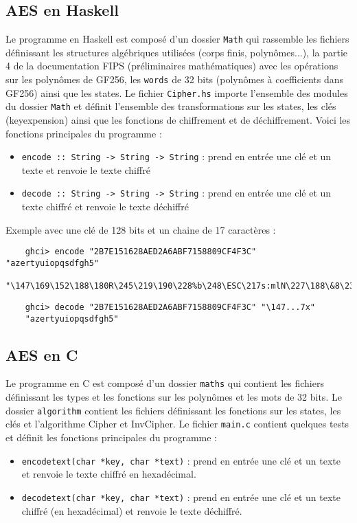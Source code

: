 \documentclass[12pt]{article}
\begin{document}
\subsection{AES en Haskell}
Le programme en Haskell est composé d'un dossier \texttt{Math} qui rassemble les fichiers définissant les structures algébriques utilisées (corps finis, polynômes...), la partie 4 de la documentation FIPS (préliminaires mathématiques) avec les opérations sur les polynômes de GF256, les \texttt{words} de 32 bits (polynômes à coefficients dans GF256) ainsi que les states. Le fichier \texttt{Cipher.hs} importe l'ensemble des modules du dossier \texttt{Math} et définit l'ensemble des transformations sur les states, les clés (keyexpension) ainsi que les fonctions de chiffrement et de déchiffrement. Voici les fonctions principales du programme :
\begin{itemize}
    \item \texttt{encode :: String -> String -> String} : prend en entrée une clé et un texte et renvoie le texte chiffré
    \item \texttt{decode :: String -> String -> String} : prend en entrée une clé et un texte chiffré et renvoie le texte déchiffré
\end{itemize}
Exemple avec une clé de 128 bits et un chaine de 17 caractères :
\begin{lstlisting}
    ghci> encode "2B7E151628AED2A6ABF7158809CF4F3C" "azertyuiopqsdfgh5"
    "\147\169\152\188\180R\245\219\190\228%b\248\ESC\217s:mlN\227\188\&8\237J\188\\\f(\150\&7x"
\end{lstlisting}
\begin{lstlisting}
    ghci> decode "2B7E151628AED2A6ABF7158809CF4F3C" "\147...7x"
    "azertyuiopqsdfgh5"
\end{lstlisting}
\subsection{AES en C}
Le programme en C est composé d'un dossier \texttt{maths} qui contient les fichiers définissant les types et les fonctions sur les polynômes et les mots de 32 bits. Le dossier \texttt{algorithm} contient les fichiers définissant les fonctions sur les states, les clés et l'algorithme Cipher et InvCipher. Le fichier \texttt{main.c} contient quelques tests et définit les fonctions principales du programme :
\begin{itemize}
    \item \texttt{encodetext(char *key, char *text)} : prend en entrée une clé et un texte et renvoie le texte chiffré en hexadécimal.
    \item \texttt{decodetext(char *key, char *text)} : prend en entrée une clé et un texte chiffré (en hexadécimal) et renvoie le texte déchiffré.
\end{itemize}
\end{document}
